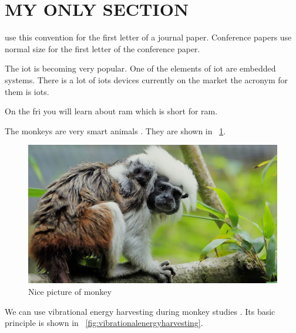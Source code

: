 \section{MY ONLY SECTION}

	\ifCLASSOPTIONjournal
		 use this convention for the first letter of a journal paper.
	\else
		Conference papers use normal size for the first letter of the conference paper.
	\fi	

The \ac{iot} is becoming very popular. One of the elements of \ac{iot} are embedded systems. There is a lot of \aclp{iot} devices currently on the market the acronym for them is \acsp{iot}.

On the \acf{fri} you will learn about \acs{ram} which is short for \acl{ram}.

The monkeys are very smart animals \cite{article_first}. They are shown in \figurename ~\ref{fig:monkey}. 

\IEEEpubidadjcol

\begin{figure}[ht]
	\centering
	\includegraphics[width=1.0\linewidth]{pictures/monkey}
	\caption{Nice picture of monkey \cite{figure_first}}
	\label{fig:monkey}
\end{figure}


We can use vibrational energy harvesting during monkey studies \cite{article_second}. Its basic principle is shown in \figurename  ~\ref{fig:vibrationalenergyharvesting}.

